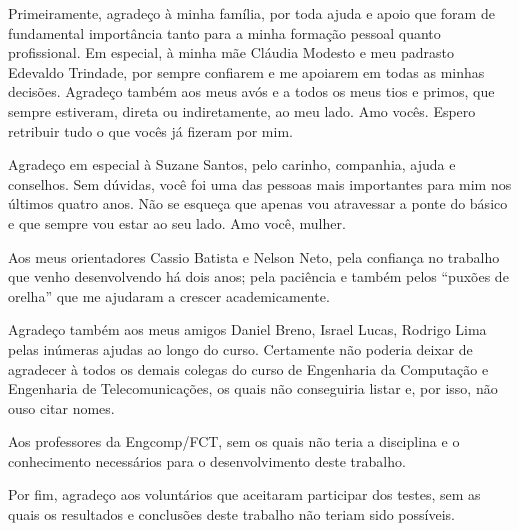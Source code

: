 Primeiramente, agradeço à minha família, por toda ajuda e apoio que foram de
fundamental importância tanto para a minha formação pessoal quanto profissional.
Em especial, à minha mãe Cláudia Modesto e meu padrasto Edevaldo Trindade, por
sempre confiarem e me apoiarem em todas as minhas decisões. Agradeço também aos
meus avós e a todos os meus tios e primos, que sempre estiveram, direta ou
indiretamente, ao meu lado. Amo vocês. Espero retribuir tudo o que vocês
já fizeram por mim.

Agradeço em especial à Suzane Santos, pelo carinho, companhia, ajuda e
conselhos. Sem dúvidas, você foi uma das pessoas mais importantes para mim nos
últimos quatro anos. Não se esqueça que apenas vou atravessar a ponte do básico 
e que sempre vou estar ao seu lado. Amo você, mulher.  

Aos meus orientadores Cassio Batista e Nelson Neto, pela confiança no trabalho
que venho desenvolvendo há dois anos; pela paciência e também pelos ``puxões de
orelha'' que me ajudaram a crescer academicamente. 

Agradeço também aos meus amigos Daniel Breno, Israel Lucas, Rodrigo Lima pelas
inúmeras ajudas ao longo do curso. Certamente não poderia deixar de agradecer à
todos os demais colegas do curso de Engenharia da Computação e Engenharia de
Telecomunicações, os quais não conseguiria listar e, por isso, não ouso citar
nomes.

Aos professores da Engcomp/FCT, sem os quais não teria a disciplina e o
conhecimento necessários para o desenvolvimento deste trabalho.

Por fim, agradeço aos voluntários que aceitaram participar dos testes, sem as quais
os resultados e conclusões deste trabalho não teriam sido possíveis.
